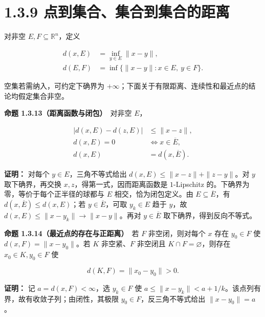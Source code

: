 \documentclass[11pt,a4paper]{article}
\begin{document}
\section[\S{}1.3.9
点到集合、集合到集合的距离]{1.3.9
点到集合、集合到集合的距离}\label{ux70b9ux5230ux96c6ux5408ux96c6ux5408ux5230ux96c6ux5408ux7684ux8dddux79bb}

对非空 \(E,F\subseteq\mathbb R^n\)，定义

\begin{equation*}
\begin{aligned}
d(x,E)&=\inf_{y\in E}\|x-y\|,\\
d(E,F)&=\inf\{\|x-y\|:x\in E,\ y\in F\}.
\end{aligned}\tag{1.3.6}
\end{equation*}

空集若需纳入，可约定下确界为
\(+\infty\)；下面关于有限距离、连续性和最近点的结论均假定集合非空。

\textbf{命题 1.3.13（距离函数与闭包）}　对非空 \(E\)，

\begin{equation*}
\begin{aligned}
|d(x,E)-d(z,E)|&\leq\|x-z\|,\\
d(x,E)=0&\Longleftrightarrow x\in\overline E,\\
d(x,E)&=d(x,\overline E).
\end{aligned}\tag{1.3.7}
\end{equation*}

\textbf{证明：} 对每个 \(y\in E\)，三角不等式给出
\(d(x,E)\leq\|x-z\|+\|z-y\|\)。对 \(y\) 取下确界，再交换
\(x,z\)，得第一式，因而距离函数是 \(1\)-Lipschitz
的。下确界为零，等价于每个正半径的球都与 \(E\) 相交，恰为闭包定义。由
\(E\subseteq\overline E\)，有 \(d(x,\overline E)\leq d(x,E)\)；若
\(y\in\overline E\)，可取 \(y_k\in E\) 趋于 \(y\)，故
\(d(x,E)\leq\|x-y_k\|\to\|x-y\|\)。再对 \(y\in\overline E\)
取下确界，得到反向不等式。

\textbf{命题 1.3.14（最近点的存在与正距离）}　若 \(F\) 非空闭，则对每个
\(x\) 存在 \(y_0\in F\) 使 \(d(x,F)=\|x-y_0\|\)。若 \(K\) 非空紧、\(F\)
非空闭且 \(K\cap F=\varnothing\)，则存在 \(x_0\in K,y_0\in F\) 使

\begin{equation*}
d(K,F)=\|x_0-y_0\|>0.\tag{1.3.8}
\end{equation*}

\textbf{证明：} 记 \(a=d(x,F)<\infty\)，选 \(y_k\in F\) 使
\(a\leq\|x-y_k\|<a+1/k\)。该点列有界，故有收敛子列；由闭性，其极限
\(y_0\in F\)，反三角不等式给出 \(\|x-y_0\|=a\)。
\end{document}
